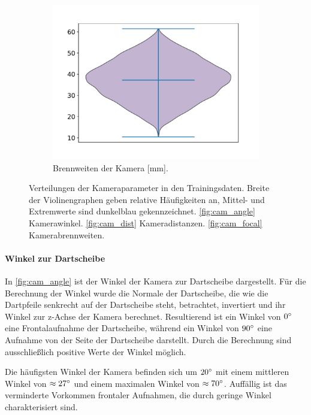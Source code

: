 \begin{figure}
    \begin{subfigure}{0.475\textwidth}
        \centering
        \includegraphics[width=\textwidth]{imgs/rendering/ergebnisse/cam_focal.pdf}
        \caption{Brennweiten der Kamera [mm].}
        \label{fig:cam_focal}
    \end{subfigure}
    \caption{Verteilungen der Kameraparameter in den Trainingsdaten. Breite der Violinengraphen geben relative Häufigkeiten an, Mittel- und Extremwerte sind dunkelblau gekennzeichnet. \autoref{fig:cam_angle} Kamerawinkel. \autoref{fig:cam_dist} Kameradistanzen. \autoref{fig:cam_focal} Kamerabrennweiten.}
    \label{img:kamera_meta}
\end{figure}

\paragraph{Winkel zur Dartscheibe}

In \autoref{fig:cam_angle} ist der Winkel der Kamera zur Dartscheibe dargestellt. Für die Berechnung der Winkel wurde die Normale der Dartscheibe, die wie die Dartpfeile senkrecht auf der Dartscheibe steht, betrachtet, invertiert und ihr Winkel zur z-Achse der Kamera berechnet. Resultierend ist ein Winkel von $0^{\circ}$ eine Frontalaufnahme der Dartscheibe, während ein Winkel von $90^{\circ}$ eine Aufnahme von der Seite der Dartscheibe darstellt. Durch die Berechnung sind ausschließlich positive Werte der Winkel möglich.

Die häufigsten Winkel der Kamera befinden sich um $20^{\circ}$ mit einem mittleren Winkel von $\approx27^{\circ}$ und einem maximalen Winkel von $\approx70^{\circ}$. Auffällig ist das verminderte Vorkommen frontaler Aufnahmen, die durch geringe Winkel charakterisiert sind.

